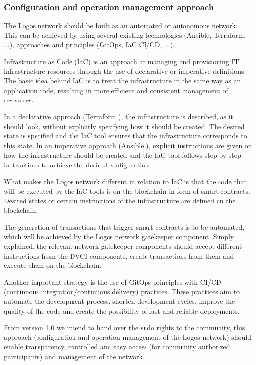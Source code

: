 \documentclass[]{article}
\begin{document}
\subsubsection{Configuration and operation management approach}
The Logos network should be built as an automated or autonomous network. 
This can be achieved by using several existing technologies (Ansible, Terraform, ...), approaches and principles (GitOps, IaC CI/CD, ...). 

Infrastructure as Code (IaC) \cite{Wikipedia-iac} is an approach at managing and provisioning IT infrastructure resources through the use of declarative or imperative definitions.
The basic idea behind IaC is to treat the infrastructure in the same way as an application code, resulting in more efficient and consistent management of resources.

In a declarative approach (Terraform \cite{HashiDoc}), the infrastructure is described, as it should look, without explicitly specifying how it should be created. 
The desired state is specified and the IaC tool ensures that the infrastructure corresponds to this state.
In an imperative approach (Ansible \cite{AnsiDoc}), explicit instructions are given on how the infrastructure should be created and the IaC tool follows step-by-step instructions to achieve the desired configuration.

What makes the Logos network different in relation to IaC is that the code that will be executed by the IaC tools is on the blockchain in form of smart contracts.
Desired states or certain instructions of the infrastructure are defined on the blockchain.

The generation of transactions that trigger smart contracts is to be automated, which will be achieved by the Logos network gatekeeper component. 
Simply explained, the relevant network gatekeeper components should accept different instructions from the DVCI components, create transactions from them and execute them on the blockchain.

Another important strategy is the use of GitOps \cite{GitLabDoc} principles with CI/CD (continuous integration/continuous delivery) \cite{GitLabDoc-ci-cd} practices.
These practices aim to automate the development process, shorten development cycles, improve the quality of the code and create the possibility of fast and reliable deployments.

From version 1.0 we intend to hand over the sudo rights to the community, this approach (configuration and operation management of the Logos network) should enable transparency, controlled and easy access (for community authorized participants) and management of the network.
\end{document}
